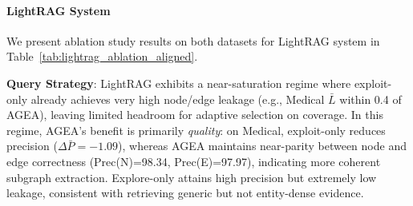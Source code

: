 
\paragraph{LightRAG System}

We present ablation study results on both datasets for LightRAG system in 
Table~\ref{tab:lightrag_ablation_aligned}.

\noindent\textbf{Query Strategy}: LightRAG exhibits a near-saturation regime where exploit-only already achieves very high node/edge leakage (e.g., Medical $\bar{L}$ within 0.4 of AGEA), leaving limited headroom for adaptive selection on coverage.
In this regime, AGEA’s benefit is primarily \emph{quality}: on Medical, exploit-only reduces precision ($\Delta\bar{P}=-1.09$), whereas AGEA maintains near-parity between node and edge correctness (Prec(N)=98.34, Prec(E)=97.97), indicating more coherent subgraph extraction.
Explore-only attains high precision but extremely low leakage, consistent with retrieving generic but not entity-dense evidence.

